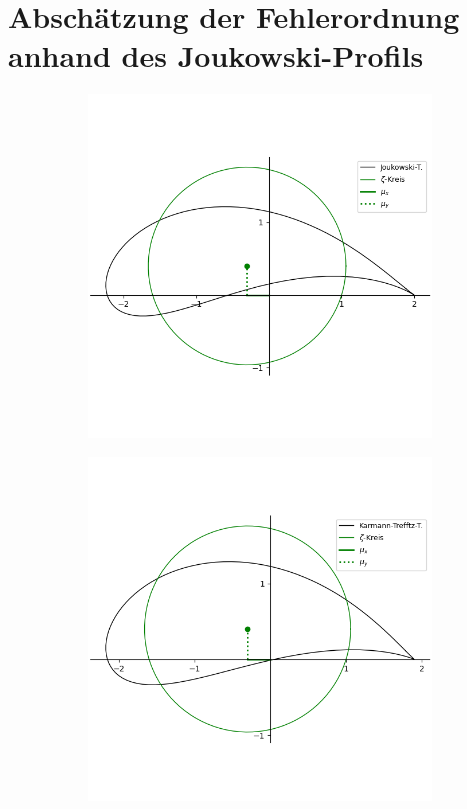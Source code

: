 \section{Abschätzung der Fehlerordnung anhand des Joukowski-Profils}
\begin{figure}[]
  \centering
  \begin{subfigure}[b]{0.5\linewidth}
    \centering\includegraphics[scale=0.45]{figures/joukowskitrans.png} 
    \caption{\label{fig:joukowskitrans}}
  \end{subfigure}%
  \begin{subfigure}[b]{0.5\linewidth}
    \centering\includegraphics[scale=0.45]{figures/karmantrefftztrans.png} 

\end{subfigure}
\end{figure}
